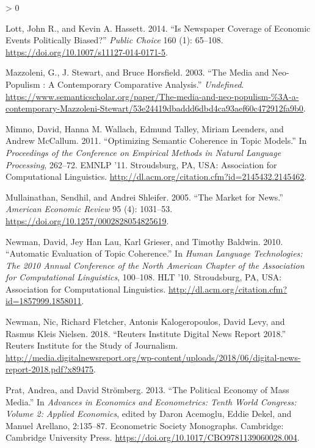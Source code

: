 \documentclass[
  12pt,
]{article}
\newlength{\cslhangindent}
\newenvironment{CSLReferences}[2] %
 {%
  \setlength{\parindent}{0pt}
  \ifodd #1 \everypar{\setlength{\hangindent}{\cslhangindent}}\ignorespaces\fi
  \ifnum #2 > 0
  \setlength{\parskip}{#2\baselineskip}
  \fi
 }%
 {}
\begin{document}
\begin{CSLReferences}{1}{0}
\leavevmode\hypertarget{ref-lott_is_2014}{}%
Lott, John R., and Kevin A. Hassett. 2014. {``Is Newspaper Coverage of
Economic Events Politically Biased?''} \emph{Public Choice} 160 (1):
65--108. \url{https://doi.org/10.1007/s11127-014-0171-5}.

\leavevmode\hypertarget{ref-mazzoleni_media_2003}{}%
Mazzoleni, G., J. Stewart, and Bruce Horsfield. 2003. {``The Media and
Neo-Populism : A Contemporary Comparative Analysis.''} \emph{Undefined}.
\url{https://www.semanticscholar.org/paper/The-media-and-neo-populism-\%3A-a-contemporary-Mazzoleni-Stewart/53e24419dbaddd6dbd4ca93aef60c472912fa9b0}.

\leavevmode\hypertarget{ref-mimno_optimizing_2011}{}%
Mimno, David, Hanna M. Wallach, Edmund Talley, Miriam Leenders, and
Andrew McCallum. 2011. {``Optimizing Semantic Coherence in Topic
Models.''} In \emph{Proceedings of the Conference on Empirical Methods
in Natural Language Processing}, 262--72. {EMNLP} '11. Stroudsburg,
{PA}, {USA}: Association for Computational Linguistics.
\url{http://dl.acm.org/citation.cfm?id=2145432.2145462}.

\leavevmode\hypertarget{ref-mullainathan_market_2005}{}%
Mullainathan, Sendhil, and Andrei Shleifer. 2005. {``The Market for
News.''} \emph{American Economic Review} 95 (4): 1031--53.
\url{https://doi.org/10.1257/0002828054825619}.

\leavevmode\hypertarget{ref-newman_automatic_2010}{}%
Newman, David, Jey Han Lau, Karl Grieser, and Timothy Baldwin. 2010.
{``Automatic Evaluation of Topic Coherence.''} In \emph{Human Language
Technologies: The 2010 Annual Conference of the North American Chapter
of the Association for Computational Linguistics}, 100--108. {HLT} '10.
Stroudsburg, {PA}, {USA}: Association for Computational Linguistics.
\url{http://dl.acm.org/citation.cfm?id=1857999.1858011}.

\leavevmode\hypertarget{ref-newman_reuters_2018}{}%
Newman, Nic, Richard Fletcher, Antonis Kalogeropoulos, David Levy, and
Rasmus Kleis Nielsen. 2018. {``Reuters Institute Digital News Report
2018.''} Reuters Institute for the Study of Journalism.
\url{http://media.digitalnewsreport.org/wp-content/uploads/2018/06/digital-news-report-2018.pdf?x89475}.

\leavevmode\hypertarget{ref-acemoglu_political_2013}{}%
Prat, Andrea, and David Strömberg. 2013. {``The Political Economy of
Mass Media.''} In \emph{Advances in Economics and Econometrics: Tenth
World Congress: Volume 2: Applied Economics}, edited by Daron Acemoglu,
Eddie Dekel, and Manuel Arellano, 2:135--87. Econometric Society
Monographs. Cambridge: Cambridge University Press.
\url{https://doi.org/10.1017/CBO9781139060028.004}.


\end{CSLReferences}
\end{document}
